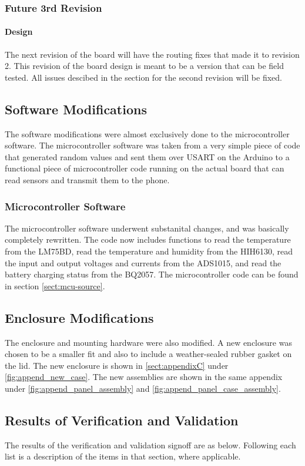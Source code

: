 \documentclass{article}
\numberwithin{figure}{section}
\numberwithin{equation}{section}
\begin{document}
{\subsubsection{Future 3rd Revision}\label{conclusion-pcb-rev3}
\paragraph{Design}
The next revision of the board will have the routing fixes that made it to revision 2. This revision of the board design is meant to be a version that can be field tested. All issues descibed in the section for the second revision will be fixed.
\subsection{Software Modifications}\label{conclusion-software}
The software modifications were almost exclusively done to the microcontroller software. The microcontroller software was taken from a very simple piece of code that generated random values and sent them over USART on the Arduino to a functional piece of microcontroller code running on the actual board that can read sensors and transmit them to the phone.
\subsubsection{Microcontroller Software}\label{conclusion-mcu-software}
The microcontroller software underwent substanital changes, and was basically completely rewritten. The code now includes functions to read the temperature from the LM75BD, read the temperature and humidity from the HIH6130, read the input and output voltages and currents from the ADS1015, and read the battery charging status from the BQ2057. The microcontroller code can be found in section \ref{sect:mcu-source}.

\subsection{Enclosure Modifications}\label{conclusion-enclosure}
The enclosure and mounting hardware were also modified. A new enclosure was chosen to be a smaller fit and also to include a weather-sealed rubber gasket on the lid. The new enclosure is shown in \ref{sect:appendixC} under \ref{fig:append_new_case}. The new assemblies are shown in the same appendix under \ref{fig:append_panel_assembly} and \ref{fig:append_panel_case_assembly}.

\subsection{Results of Verification and Validation}\label{conclusion-vv}
The results of the verification and validation signoff are as below. Following each list is a description of the items in that section, where applicable.

}
\end{document}
